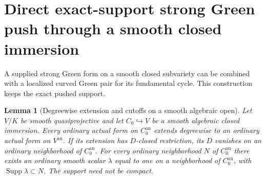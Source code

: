 \documentclass[11pt,a4paper]{article}
\newtheorem{lemma}[theorem]{Lemma}
\theoremstyle{definition}
\theoremstyle{remark}
\numberwithin{equation}{section}
\begin{document}
\section[Exact-support Green push through a closed immersion]{Direct exact-support strong Green push through a smooth closed immersion}
\label{r16gp:section}

A supplied strong Green form on a smooth closed subvariety can be combined with a localized curved Green pair for its fundamental cycle. This construction keeps the exact pushed support.

\begin{lemma}[Degreewise extension and cutoffs on a smooth algebraic open]
\label{r16gp:open-extension}
Let $V/K$ be smooth quasiprojective and let $C_0\hookrightarrow V$
be a smooth algebraic closed immersion.  Every ordinary actual form
on $C_0^{\mathrm{an}}$ extends degreewise to an ordinary actual form
on $V^{\mathrm{an}}$.  If its extension has $D$-closed restriction,
its $D$ vanishes on an ordinary neighborhood of $C_0^{\mathrm{an}}$.
For every ordinary neighborhood $N$ of $C_0^{\mathrm{an}}$ there
exists an ordinary smooth scalar $\lambda$ equal to one on a
neighborhood of $C_0^{\mathrm{an}}$, with
$\operatorname{Supp}\lambda\subset N$.  The support need not be compact.
\end{lemma}
\end{document}
